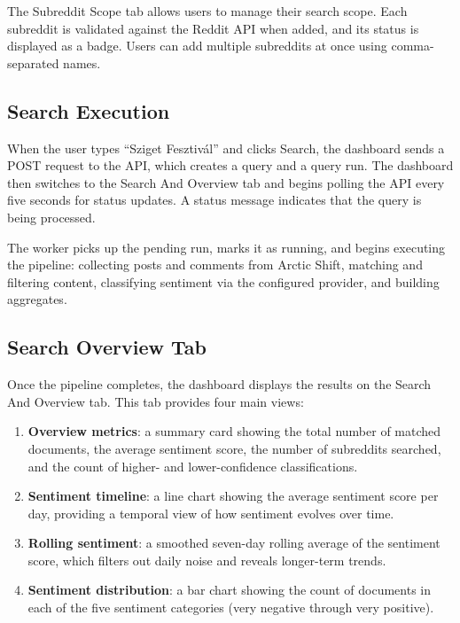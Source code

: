 The Subreddit Scope tab allows users to manage their search scope. Each subreddit is validated against the Reddit API when added, and its status is displayed as a badge. Users can add multiple subreddits at once using comma-separated names.

\subsection{Search Execution}
\label{sec:search_execution}

When the user types ``Sziget Fesztiv\'{a}l'' and clicks Search, the dashboard sends a POST request to the API, which creates a query and a query run. The dashboard then switches to the Search And Overview tab and begins polling the API every five seconds for status updates. A status message indicates that the query is being processed.

The worker picks up the pending run, marks it as running, and begins executing the pipeline: collecting posts and comments from Arctic Shift, matching and filtering content, classifying sentiment via the configured provider, and building aggregates.

\subsection{Search Overview Tab}

Once the pipeline completes, the dashboard displays the results on the Search And Overview tab. This tab provides four main views:

\begin{enumerate}
    \item \textbf{Overview metrics}: a summary card showing the total number of matched documents, the average sentiment score, the number of subreddits searched, and the count of higher- and lower-confidence classifications.
    \item \textbf{Sentiment timeline}: a line chart showing the average sentiment score per day, providing a temporal view of how sentiment evolves over time.
    \item \textbf{Rolling sentiment}: a smoothed seven-day rolling average of the sentiment score, which filters out daily noise and reveals longer-term trends.
    \item \textbf{Sentiment distribution}: a bar chart showing the count of documents in each of the five sentiment categories (very negative through very positive).
\end{enumerate}

